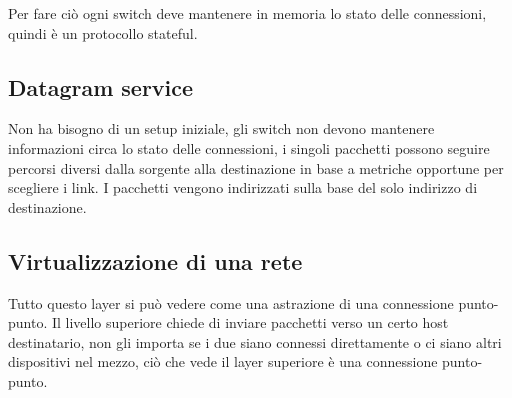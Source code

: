 Per fare ciò ogni switch deve mantenere in memoria lo stato delle connessioni, quindi è un protocollo stateful.

\subsection{Datagram service}
Non ha bisogno di un setup iniziale, gli switch non devono mantenere informazioni circa lo stato delle connessioni, i singoli pacchetti possono seguire percorsi diversi dalla sorgente alla destinazione in base a metriche opportune per scegliere i link.
I pacchetti vengono indirizzati sulla base del solo indirizzo di destinazione.

\subsection{Virtualizzazione di una rete}
Tutto questo layer si può vedere come una astrazione di una connessione punto-punto.
Il livello superiore chiede di inviare pacchetti verso un certo host destinatario, non gli importa se i due siano connessi direttamente o ci siano altri dispositivi nel mezzo, ciò che vede il layer superiore è una connessione punto-punto.

